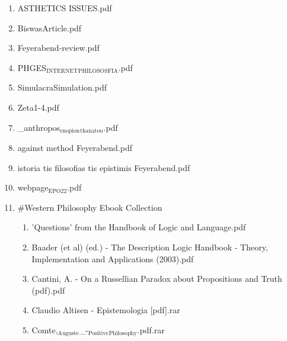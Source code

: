 \documentclass[11pt]{article}
\begin{document}
\begin{enumerate}
\begin{enumerate}
\begin{enumerate}
\begin{enumerate}
\begin{enumerate}
\item ASTHETICS ISSUES.pdf
\label{sec-1-1-1-1-7-3-39-3}

\item BiswasArticle.pdf
\label{sec-1-1-1-1-7-3-39-4}

\item Feyerabend-review.pdf
\label{sec-1-1-1-1-7-3-39-5}

\item PHGES$_{\text{INTERNET}}$$_{\text{PHILOSOSFIA}}$.pdf
\label{sec-1-1-1-1-7-3-39-6}

\item SimulacraSimulation.pdf
\label{sec-1-1-1-1-7-3-39-7}

\item Zeta1-4.pdf
\label{sec-1-1-1-1-7-3-39-8}

\item \_anthropos$_{\text{enopion}}$$_{\text{thanatou}}$.pdf
\label{sec-1-1-1-1-7-3-39-9}

\item against method Feyerabend.pdf
\label{sec-1-1-1-1-7-3-39-10}

\item istoria tis filosofias tis epistimis Feyerabend.pdf
\label{sec-1-1-1-1-7-3-39-11}

\item webpage$_{\text{EPO22}}$.pdf
\label{sec-1-1-1-1-7-3-39-12}

\item \#Western Philosophy Ebook Collection
\label{sec-1-1-1-1-7-3-39-13}
\begin{enumerate}
\item 'Questions' from the Handbook of Logic and Language.pdf
\label{sec-1-1-1-1-7-3-39-13-1}

\item Baader (et al) (ed.) - The Description Logic Handbook - Theory, Implementation and Applications (2003).pdf
\label{sec-1-1-1-1-7-3-39-13-2}

\item Cantini, A. - On a Russellian Paradox about Propositions and Truth (pdf).pdf
\label{sec-1-1-1-1-7-3-39-13-3}

\item Claudio Altisen - Epistemologia [pdf].rar
\label{sec-1-1-1-1-7-3-39-13-4}

\item Comte,$_{\text{Auguste}}$\_-$_{\text{Positive}}$$_{\text{Philosophy}}$.pdf.rar
\label{sec-1-1-1-1-7-3-39-13-5}


\end{enumerate}
\end{enumerate}
\end{enumerate}
\end{enumerate}
\end{enumerate}
\end{enumerate}
\end{document}
